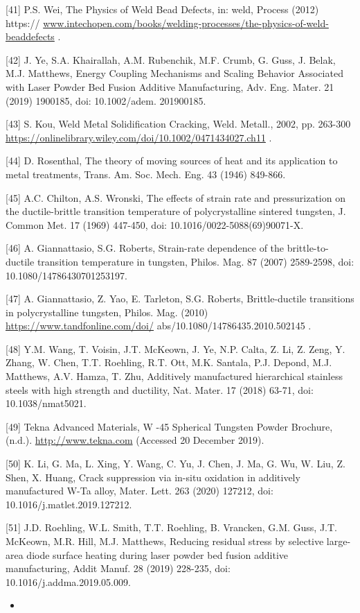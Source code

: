 \documentclass[10pt]{article}
\begin{document}
[41] P.S. Wei, The Physics of Weld Bead Defects, in: weld, Process (2012) https:// \href{http://www.intechopen.com/books/welding-processes/the-physics-of-weld-beaddefects}{www.intechopen.com/books/welding-processes/the-physics-of-weld-beaddefects} .

[42] J. Ye, S.A. Khairallah, A.M. Rubenchik, M.F. Crumb, G. Guss, J. Belak, M.J. Matthews, Energy Coupling Mechanisms and Scaling Behavior Associated with Laser Powder Bed Fusion Additive Manufacturing, Adv. Eng. Mater. 21 (2019) 1900185, doi: 10.1002/adem. 201900185.

[43] S. Kou, Weld Metal Solidification Cracking, Weld. Metall., 2002, pp. 263-300 \href{https://onlinelibrary.wiley.com/doi/10.1002/0471434027.ch11}{https://onlinelibrary.wiley.com/doi/10.1002/0471434027.ch11} .

[44] D. Rosenthal, The theory of moving sources of heat and its application to metal treatments, Trans. Am. Soc. Mech. Eng. 43 (1946) 849-866.

[45] A.C. Chilton, A.S. Wronski, The effects of strain rate and pressurization on the ductile-brittle transition temperature of polycrystalline sintered tungsten, J. Common Met. 17 (1969) 447-450, doi: 10.1016/0022-5088(69)90071-X.

[46] A. Giannattasio, S.G. Roberts, Strain-rate dependence of the brittle-to-ductile transition temperature in tungsten, Philos. Mag. 87 (2007) 2589-2598, doi: 10.1080/14786430701253197.

[47] A. Giannattasio, Z. Yao, E. Tarleton, S.G. Roberts, Brittle-ductile transitions in polycrystalline tungsten, Philos. Mag. (2010) \href{https://www.tandfonline.com/doi/}{https://www.tandfonline.com/doi/} abs/10.1080/14786435.2010.502145 .

[48] Y.M. Wang, T. Voisin, J.T. McKeown, J. Ye, N.P. Calta, Z. Li, Z. Zeng, Y. Zhang, W. Chen, T.T. Roehling, R.T. Ott, M.K. Santala, P.J. Depond, M.J. Matthews, A.V. Hamza, T. Zhu, Additively manufactured hierarchical stainless steels with high strength and ductility, Nat. Mater. 17 (2018) 63-71, doi: 10.1038/nmat5021.

[49] Tekna Advanced Materials, W -45 Spherical Tungsten Powder Brochure, (n.d.). \href{http://www.tekna.com}{http://www.tekna.com} (Accessed 20 December 2019).

[50] K. Li, G. Ma, L. Xing, Y. Wang, C. Yu, J. Chen, J. Ma, G. Wu, W. Liu, Z. Shen, X. Huang, Crack suppression via in-situ oxidation in additively manufactured W-Ta alloy, Mater. Lett. 263 (2020) 127212, doi: 10.1016/j.matlet.2019.127212.

[51] J.D. Roehling, W.L. Smith, T.T. Roehling, B. Vrancken, G.M. Guss, J.T. McKeown, M.R. Hill, M.J. Matthews, Reducing residual stress by selective large-area diode surface heating during laser powder bed fusion additive manufacturing, Addit Manuf. 28 (2019) 228-235, doi: 10.1016/j.addma.2019.05.009.

\begin{itemize}
  \item 
\end{itemize}
\end{document}
